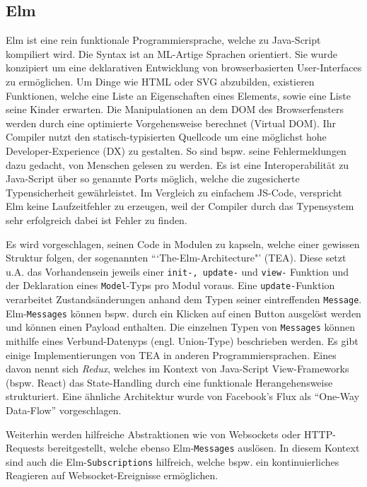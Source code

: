 \subsection{Elm}
Elm ist eine rein funktionale Programmiersprache, welche zu Java-Script kompiliert wird.
Die Syntax ist an ML-Artige Sprachen orientiert.
Sie wurde konzipiert um eine deklarativen Entwicklung von browserbasierten User-Interfaces zu ermöglichen.
Um Dinge wie HTML oder SVG abzubilden, existieren Funktionen, welche eine Liste an Eigenschaften eines Elements, sowie eine Liste seine Kinder erwarten.
Die Manipulationen an dem DOM des Browserfensters werden durch eine optimierte Vorgehensweise berechnet (Virtual DOM).
Ihr Compiler nutzt den statisch-typisierten Quellcode um eine möglichst hohe Developer-Experience (DX) zu gestalten.
So sind \ac{bspw.} seine Fehlermeldungen dazu gedacht, von Menschen gelesen zu werden.
Es ist eine Interoperabilität zu Java-Script über so genannte Ports möglich, welche die zugesicherte Typensicherheit gewährleistet.
Im Vergleich zu einfachem JS-Code, verspricht Elm keine Laufzeitfehler zu erzeugen, weil der Compiler durch das Typensystem sehr erfolgreich dabei ist Fehler zu finden.
\par
Es wird vorgeschlagen, seinen Code in Modulen zu kapseln, welche einer gewissen Struktur folgen, der sogenannten “`The-Elm-Architecture"' (TEA).
Diese setzt \ac{u.A.} das Vorhandensein jeweils einer \texttt{init-, update-} und \texttt{view-} Funktion und der Deklaration eines \texttt{Model}-Typs pro Modul voraus.
Eine \texttt{update-}Funktion verarbeitet Zustandsänderungen anhand dem Typen seiner eintreffenden \texttt{Message}.
Elm-\texttt{Messages} können \ac{bspw.} durch ein Klicken auf einen Button ausgelöst werden und können einen Payload enthalten.
Die einzelnen Typen von \texttt{Messages} können mithilfe eines Verbund-Datenyps (engl. Union-Type) beschrieben werden.
Es gibt einige Implementierungen von TEA in anderen Programmiersprachen.
Eines davon nennt sich \textit{Redux}, welches im Kontext von Java-Script View-Frameworks (\ac{bspw.} React) das State-Handling durch eine funktionale Herangehensweise strukturiert.
Eine ähnliche Architektur wurde von Facebook's Flux als "`One-Way Data-Flow"' vorgeschlagen.
\par
Weiterhin werden hilfreiche Abstraktionen wie von Websockets oder HTTP-Requests bereitgestellt, welche ebenso Elm-\texttt{Messages} auslösen.
In diesem Kontext sind auch die Elm-\texttt{Subscriptions} hilfreich, welche \ac{bspw.} ein kontinuierliches Reagieren auf Websocket-Ereignisse ermöglichen.

